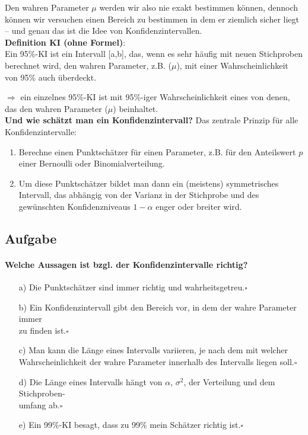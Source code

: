 \documentclass[a4paper]{article}
\begin{document}
\noindent Den wahren Parameter $\mu$ werden wir also nie exakt bestimmen können, dennoch können wir versuchen einen Bereich zu bestimmen in dem er ziemlich sicher liegt -- und genau das ist die Idee von Konfidenzintervallen.\\

\noindent \textbf{Definition KI (ohne Formel)}:\\
\noindent Ein 95\%-KI ist ein Intervall [a,b], das, wenn es sehr häufig mit neuen Stichproben berechnet wird, den wahren Parameter, z.B. ($\mu$), mit einer Wahrscheinlichkeit von 95\% auch überdeckt.

\noindent $\Rightarrow$ ein einzelnes 95\%-KI ist mit 95\%-iger Wahrscheinlichkeit eines von denen, das den wahren Parameter ($\mu$) beinhaltet.\\

\noindent \textbf{Und wie schätzt man ein Konfidenzintervall?} Das zentrale Prinzip für alle Konfidenzintervalle:

\begin{enumerate}
    \item Berechne einen Punktschätzer für einen Parameter, z.B. für den Anteilswert $p$ einer Bernoulli oder Binomialverteilung.
    \item Um diese Punktschätzer bildet man dann ein (meistens) symmetrisches Intervall, das abhängig von der Varianz in der Stichprobe und des gewünschten Konfidenzniveaus $1-\alpha$ enger oder breiter wird.
\end{enumerate}

\subsection{Aufgabe}
\paragraph{Welche Aussagen ist bzgl. der Konfidenzintervalle richtig?}
\begin{itemize}
    \item[a)]Die Punktschätzer sind immer richtig und wahrheitsgetreu.\hfill $\square$
    \item[b)]Ein Konfidenzintervall gibt den Bereich vor, in dem der wahre Parameter immer \\zu finden ist.\hfill $\square$
    \item[c)]Man kann die Länge eines Intervalls variieren, je nach dem mit welcher\\ Wahrscheinlichkeit der wahre Parameter innerhalb des Intervalls liegen soll.\hfill $\square$
    \item[d)]Die Länge eines Intervalls hängt von $\alpha$, $\sigma^2$, der Verteilung und dem Stichproben-\\umfang ab.\hfill $\square$
    \item[e)]Ein 99$\%$-KI besagt, dass zu 99$\%$ mein Schätzer richtig ist.\hfill $\square$
\end{itemize}
\end{document}
